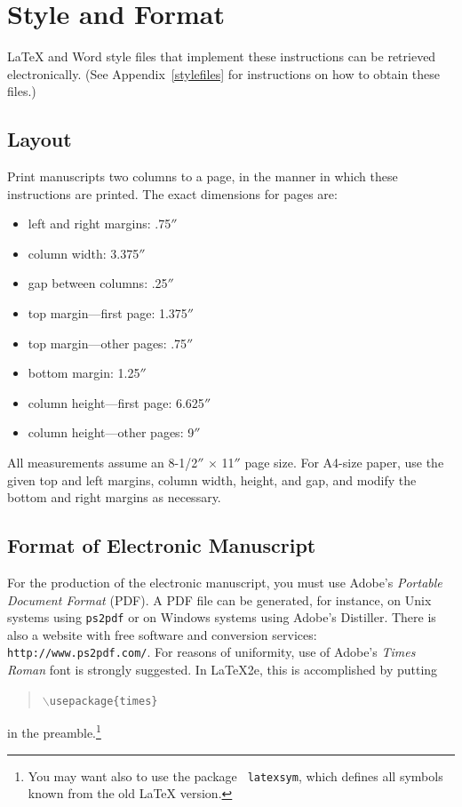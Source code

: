 \documentclass{article}
\begin{document}
\section{Style and Format}

\LaTeX{} and Word style files that implement these instructions
can be retrieved electronically. (See Appendix~\ref{stylefiles} for
instructions on how to obtain these files.)

\subsection{Layout}

Print manuscripts two columns to a page, in the manner in which these
instructions are printed. The exact dimensions for pages are:
\begin{itemize}
\item left and right margins: .75$''$
\item column width: 3.375$''$
\item gap between columns: .25$''$
\item top margin---first page: 1.375$''$
\item top margin---other pages: .75$''$
\item bottom margin: 1.25$''$
\item column height---first page: 6.625$''$
\item column height---other pages: 9$''$
\end{itemize}

All measurements assume an 8-1/2$''$ $\times$ 11$''$ page size. For
A4-size paper, use the given top and left margins, column width,
height, and gap, and modify the bottom and right margins as necessary.

\subsection{Format of Electronic Manuscript}

For the production of the electronic manuscript, you must use Adobe's
{\em Portable Document Format} (PDF). A PDF file can be generated, for
instance, on Unix systems using {\tt ps2pdf} or on Windows systems
using Adobe's Distiller. There is also a website with free software
and conversion services: {\tt http://www.ps2pdf.com/}. For reasons of
uniformity, use of Adobe's {\em Times Roman} font is strongly suggested. In
\LaTeX2e{}, this is accomplished by putting
\begin{quote} 
\mbox{\tt $\backslash$usepackage\{times\}}
\end{quote}
in the preamble.\footnote{You may want also to use the package {\tt
latexsym}, which defines all symbols known from the old \LaTeX{}
version.}
  
\end{document}
